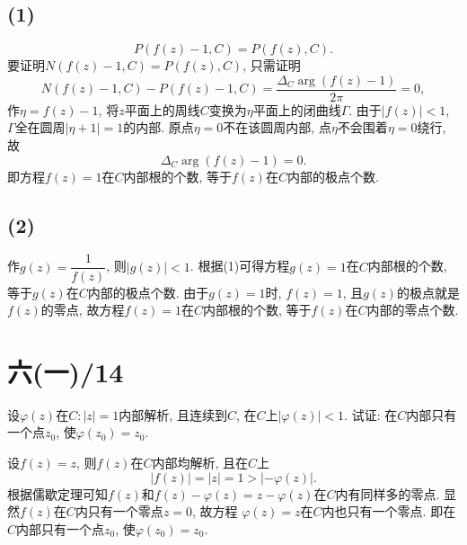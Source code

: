 \documentclass[11pt,a4paper]{article}
\begin{document}
\subsection*{(1)}
$$P(f(z)-1,C)=P(f(z),C).$$
要证明$N(f(z)-1,C)=P(f(z),C)$, 只需证明
$$N(f(z)-1,C)-P(f(z)-1,C)=\frac{\Delta_C\arg(f(z)-1)}{2\pi}=0,$$
作$\eta=f(z)-1$, 将$z$平面上的周线$C$变换为$\eta$平面上的闭曲线$\Gamma$. 由于$|f(z)|<1$, $\Gamma$全在圆周$|\eta+1|=1$的内部. 原点$\eta=0$不在该圆周内部, 点$\eta$不会围着$\eta=0$绕行, 故
$$\Delta_C\arg(f(z)-1)=0.$$
即方程$f(z)=1$在$C$内部根的个数, 等于$f(z)$在$C$内部的极点个数.

\subsection*{(2)}
作$g(z)=\dfrac{1}{f(z)}$, 则$|g(z)|<1$. 根据(1)可得方程$g(z)=1$在$C$内部根的个数, 等于$g(z)$在$C$内部的极点个数. 由于$g(z)=1$时, $f(z)=1$, 且$g(z)$的极点就是$f(z)$的零点, 故方程$f(z)=1$在$C$内部根的个数, 等于$f(z)$在$C$内部的零点个数.

\section{六(一)/14}
\begin{problem}
设$\varphi(z)$在$C:|z|=1$内部解析, 且连续到$C$, 在$C$上$|\varphi(z)|<1$. 试证: 在$C$内部只有一个点$z_0$, 使$\varphi(z_0)=z_0$.
\end{problem}

设$f(z)=z$, 则$f(z)$在$C$内部均解析, 且在$C$上
$$|f(z)|=|z|=1>|-\varphi(z)|.$$
根据儒歇定理可知$f(z)$和$f(z)-\varphi(z)=z-\varphi(z)$在$C$内有同样多的零点. 显然$f(z)$在$C$内只有一个零点$z=0$, 故方程
$\varphi(z)=z$在$C$内也只有一个零点. 即在$C$内部只有一个点$z_0$, 使$\varphi(z_0)=z_0$.
\end{document}
